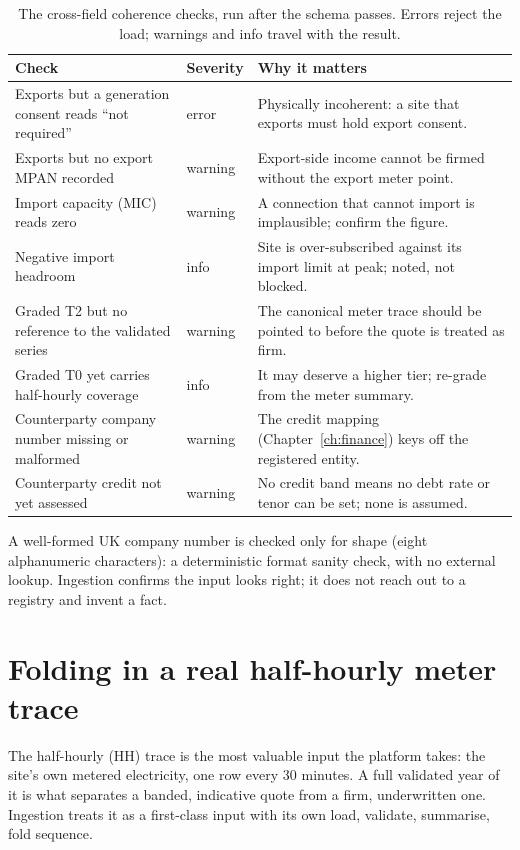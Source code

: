 \begin{table}[H]
\centering
\caption{The cross-field coherence checks, run after the schema passes. Errors reject the load; warnings and info travel with the result.}
\label{tab:coherence}
\small\sffamily
\begin{tabularx}{\textwidth}{@{}L l L@{}}
\toprule
\textbf{Check} & \textbf{Severity} & \textbf{Why it matters} \\
\midrule
Exports but a generation consent reads ``not required'' & error & Physically incoherent: a site that exports must hold export consent. \\
Exports but no export MPAN recorded & warning & Export-side income cannot be firmed without the export meter point. \\
Import capacity (MIC) reads zero & warning & A connection that cannot import is implausible; confirm the figure. \\
Negative import headroom & info & Site is over-subscribed against its import limit at peak; noted, not blocked. \\
Graded T2 but no reference to the validated series & warning & The canonical meter trace should be pointed to before the quote is treated as firm. \\
Graded T0 yet carries half-hourly coverage & info & It may deserve a higher tier; re-grade from the meter summary. \\
Counterparty company number missing or malformed & warning & The credit mapping (Chapter~\ref{ch:finance}) keys off the registered entity. \\
Counterparty credit not yet assessed & warning & No credit band means no debt rate or tenor can be set; none is assumed. \\
\bottomrule
\end{tabularx}
\end{table}

A well-formed UK company number is checked only for shape (eight alphanumeric characters): a deterministic format sanity check, with no external lookup. Ingestion confirms the input looks right; it does not reach out to a registry and invent a fact.

\section{Folding in a real half-hourly meter trace}

The half-hourly (HH) trace is the most valuable input the platform takes: the site's own metered electricity, one row every 30 minutes. A full validated year of it is what separates a banded, indicative quote from a firm, underwritten one. Ingestion treats it as a first-class input with its own load, validate, summarise, fold sequence.

